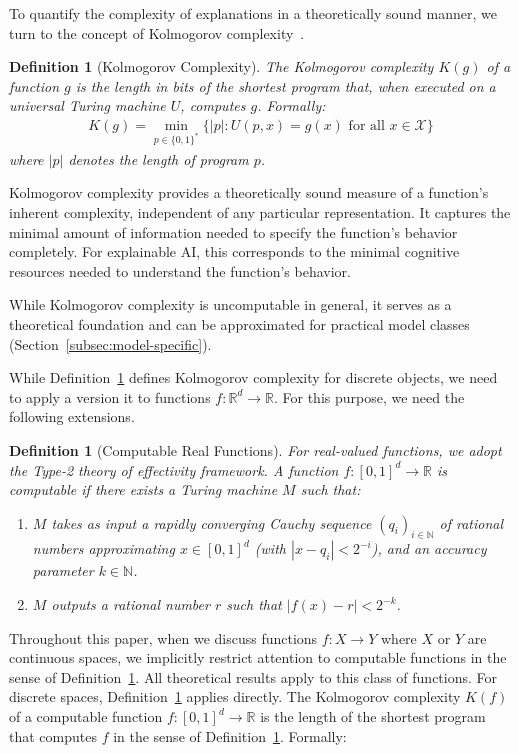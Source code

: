 \documentclass[11pt,letter,leqno]{article}
\newtheorem{definition}[theorem]{Definition}
\begin{document}
To quantify the complexity of explanations in a theoretically sound manner, we turn to the concept of Kolmogorov complexity~\cite{Kolmogorov1968, Chaitin1969, Li2008}.

\begin{definition}[Kolmogorov Complexity]
\label{def:kolmogorov}
The Kolmogorov complexity $K(g)$ of a function $g$ is the length in bits of the shortest program that, when executed on a universal Turing machine $U$, computes $g$. Formally:
\begin{align}
K(g) = \min_{p \in \{0,1\}^*} \{|p| : U(p, x) = g(x) \text{ for all } x \in \mathcal{X}\}
\end{align}
where $|p|$ denotes the length of program $p$.
\end{definition}

Kolmogorov complexity provides a theoretically sound measure of a function's inherent complexity, independent of any particular representation.  It captures the minimal amount of information needed to specify the function's behavior completely.  For explainable AI, this corresponds to the minimal cognitive resources needed to understand the function's behavior.

While Kolmogorov complexity is uncomputable in general, it serves as a theoretical foundation and can be approximated for practical model classes (Section~\ref{subsec:model-specific}).

While Definition~\ref{def:kolmogorov} defines Kolmogorov complexity for discrete objects, we need to apply a version it to functions $f: \mathbb{R}^d \to \mathbb{R}$.  For this purpose, we need the following extensions.

\begin{definition}[Computable Real Functions]
\label{def:computable}
For real-valued functions, we adopt the Type-2 theory of effectivity framework. A function $f: [0,1]^d \to \mathbb{R}$ is computable if there exists a Turing machine $M$ such that:
\begin{enumerate}
\item $M$ takes as input a rapidly converging Cauchy sequence $(q_i)_{i \in \mathbb{N}}$ of rational numbers approximating $x \in [0,1]^d$ (with $|x - q_i| < 2^{-i}$), and an accuracy parameter $k \in \mathbb{N}$.
\item $M$ outputs a rational number $r$ such that $|f(x) - r| < 2^{-k}$.
\end{enumerate}
\end{definition}

Throughout this paper, when we discuss functions $f: X \to Y$ where $X$ or $Y$ are continuous spaces, we implicitly restrict attention to computable functions in the sense of Definition~\ref{def:computable}.  All theoretical results apply to this class of functions. For discrete spaces, Definition~\ref{def:kolmogorov} applies directly.  The Kolmogorov complexity $K(f)$ of a computable function $f: [0,1]^d \to \mathbb{R}$ is the length of the shortest program that computes $f$ in the sense of Definition~\ref{def:computable}.  Formally:
\end{document}
